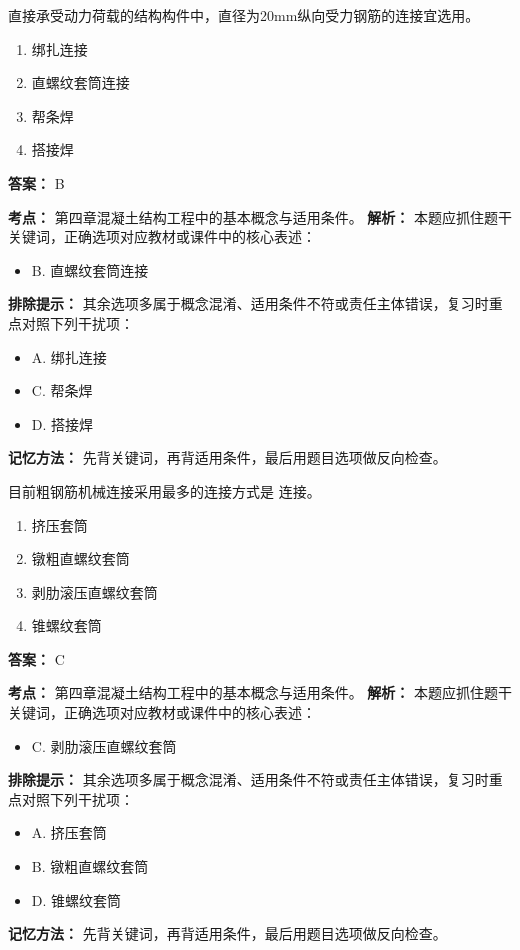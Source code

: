 \documentclass[UTF8,fontset=fandol,11pt]{ctexart}
\begin{document}
\vspace{0.2em}

\begin{quizbox}[title={第 18 题}]
直接承受动力荷载的结构构件中，直径为20mm纵向受力钢筋的连接宜选用。\\
\begin{enumerate}[label=\Alph*.]
\item 绑扎连接
\item 直螺纹套筒连接
\item 帮条焊
\item 搭接焊
\end{enumerate}
\textbf{答案：} B
\vspace{0.25em}
\begin{answerbox}[title={考点解析}]
\textbf{考点：} 第四章混凝土结构工程中的基本概念与适用条件。
\textbf{解析：} 本题应抓住题干关键词，正确选项对应教材或课件中的核心表述：
\begin{itemize}
\item B. 直螺纹套筒连接
\end{itemize}
\textbf{排除提示：} 其余选项多属于概念混淆、适用条件不符或责任主体错误，复习时重点对照下列干扰项：
\begin{itemize}
\item A. 绑扎连接
\item C. 帮条焊
\item D. 搭接焊
\end{itemize}
\textbf{记忆方法：} 先背关键词，再背适用条件，最后用题目选项做反向检查。
\end{answerbox}
\end{quizbox}

\vspace{0.2em}

\begin{quizbox}[title={第 19 题}]
目前粗钢筋机械连接采用最多的连接方式是 连接。\\
\begin{enumerate}[label=\Alph*.]
\item 挤压套筒
\item 镦粗直螺纹套筒
\item 剥肋滚压直螺纹套筒
\item 锥螺纹套筒
\end{enumerate}
\textbf{答案：} C
\vspace{0.25em}
\begin{answerbox}[title={考点解析}]
\textbf{考点：} 第四章混凝土结构工程中的基本概念与适用条件。
\textbf{解析：} 本题应抓住题干关键词，正确选项对应教材或课件中的核心表述：
\begin{itemize}
\item C. 剥肋滚压直螺纹套筒
\end{itemize}
\textbf{排除提示：} 其余选项多属于概念混淆、适用条件不符或责任主体错误，复习时重点对照下列干扰项：
\begin{itemize}
\item A. 挤压套筒
\item B. 镦粗直螺纹套筒
\item D. 锥螺纹套筒
\end{itemize}
\textbf{记忆方法：} 先背关键词，再背适用条件，最后用题目选项做反向检查。
\end{answerbox}
\end{quizbox}
\end{document}
